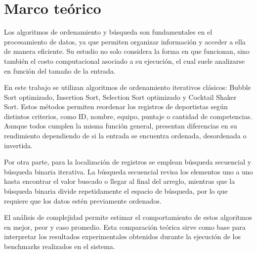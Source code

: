 \chapter{Marco teórico}

Los algoritmos de ordenamiento y búsqueda son fundamentales en el procesamiento de datos, ya que permiten organizar información y acceder a ella de manera eficiente. Su estudio no solo considera la forma en que funcionan, sino también el costo computacional asociado a su ejecución, el cual suele analizarse en función del tamaño de la entrada.

En este trabajo se utilizan algoritmos de ordenamiento iterativos clásicos: Bubble Sort optimizado, Insertion Sort, Selection Sort optimizado y Cocktail Shaker Sort. Estos métodos permiten reordenar los registros de deportistas según distintos criterios, como ID, nombre, equipo, puntaje o cantidad de competencias. Aunque todos cumplen la misma función general, presentan diferencias en su rendimiento dependiendo de si la entrada se encuentra ordenada, desordenada o invertida.

Por otra parte, para la localización de registros se emplean búsqueda secuencial y búsqueda binaria iterativa. La búsqueda secuencial revisa los elementos uno a uno hasta encontrar el valor buscado o llegar al final del arreglo, mientras que la búsqueda binaria divide repetidamente el espacio de búsqueda, por lo que requiere que los datos estén previamente ordenados.

El análisis de complejidad permite estimar el comportamiento de estos algoritmos en mejor, peor y caso promedio. Esta comparación teórica sirve como base para interpretar los resultados experimentales obtenidos durante la ejecución de los benchmarks realizados en el sistema.
